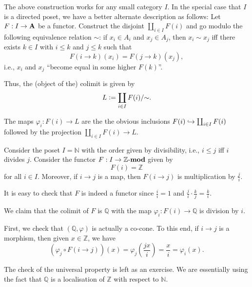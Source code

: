 \documentclass[12pt]{article}
\begin{document}
\begin{rem}
	The above construction works for any small category $I$. In the special case that $I$ is a directed poset, we have a better alternate description as follows: Let $F : I \to \mathbf{A}$ be a functor. Construct the disjoint $\coprod_{i \in I} F(i)$ and go modulo the following equivalence relation $\sim$: if $x_{i} \in A_{i}$ and $x_{j} \in A_{j}$, then $x_{i} \sim x_{j}$ iff there exists $k \in I$ with $i \le k$ and $j \le k$ such that 
	\begin{equation*} 
		F(i \to k)(x_{i}) = F(j \to k)(x_{j}),
	\end{equation*}
	i.e., $x_{i}$ and $x_{j}$ ``become equal in some higher $F(k)$''. 

	Thus, the (object of the) colimit is given by
	\begin{equation*} 
		L \vcentcolon= \coprod_{i \in I} F(i)/{\sim}.
	\end{equation*}

	The maps $\varphi_{i} : F(i) \to L$ are the the obvious inclusions $F(i) \hookrightarrow \coprod_{i \in I} F(i)$ followed by the projection $\coprod_{i \in I} F(i) \to L$.
\end{rem}

\begin{ex}
	Consider the poset $I = \mathbb{N}$ with the order given by divisibility, i.e., $i \le j$ iff $i$ divides $j$. Consider the functor $F : I \to \mathbb{Z}\text{-}\mathbf{mod}$ given by
	\begin{equation*} 
		F(i) = \mathbb{Z}
	\end{equation*}
	for all $i \in I$. Moreover, if $i \to j$ is a map, then $F(i \to j)$ is multiplication by $\frac{j}{i}$.

	It is easy to check that $F$ is indeed a functor since $\frac{i}{i} = 1$ and $\frac{j}{i} \cdot \frac{k}{j} = \frac{k}{i}$. 

	We claim that the colimit of $F$ is $\mathbb{Q}$ with the map $\varphi_{i} : F(i) \to \mathbb{Q}$ is division by $i$. 

	First, we check that $(\mathbb{Q}, \varphi)$ is actually a co-cone. To this end, if $i \to j$ is a morphism, then given $x \in \mathbb{Z}$, we have
	\begin{equation*} 
		(\varphi_{j} \circ F(i \to j))(x) = \varphi_{j}\left(\frac{j x}{i}\right) = \frac{x}{i} = \varphi_{i}(x).
	\end{equation*}

	The check of the universal property is left as an exercise. We are essentially using the fact that $\mathbb{Q}$ is a localisation of $\mathbb{Z}$ with respect to $\mathbb{N}$.
\end{ex}
\end{document}
